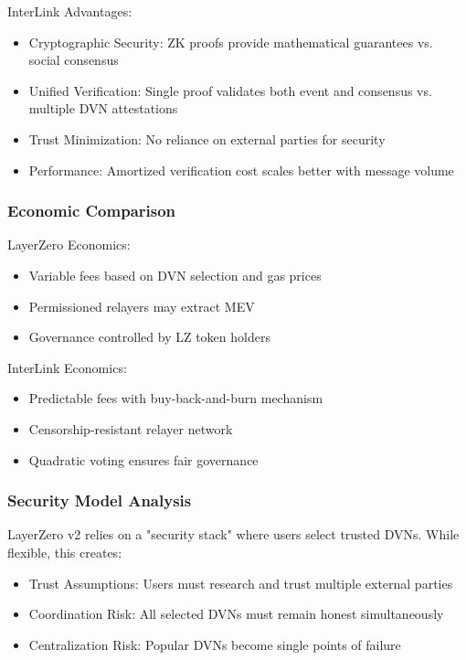 \documentclass[11pt,a4paper]{article}
\begin{document}
InterLink Advantages:
\begin{itemize}
    \item Cryptographic Security: ZK proofs provide mathematical guarantees vs. social consensus
    \item Unified Verification: Single proof validates both event and consensus vs. multiple DVN attestations
    \item Trust Minimization: No reliance on external parties for security
    \item Performance: Amortized verification cost scales better with message volume
\end{itemize}

\subsubsection{Economic Comparison}

LayerZero Economics:
\begin{itemize}
    \item Variable fees based on DVN selection and gas prices
    \item Permissioned relayers may extract MEV
    \item Governance controlled by LZ token holders
\end{itemize}

InterLink Economics:
\begin{itemize}
    \item Predictable fees with buy-back-and-burn mechanism
    \item Censorship-resistant relayer network
    \item Quadratic voting ensures fair governance
\end{itemize}

\subsubsection{Security Model Analysis}

LayerZero v2 relies on a "security stack" where users select trusted DVNs. While flexible, this creates:
\begin{itemize}
    \item Trust Assumptions: Users must research and trust multiple external parties
    \item Coordination Risk: All selected DVNs must remain honest simultaneously
    \item Centralization Risk: Popular DVNs become single points of failure
\end{itemize}
\end{document}
